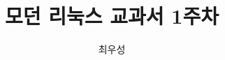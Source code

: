 \documentclass[11pt, a4paper, oneside, chapter, romanfixed]{oblivoir}
\begin{document}
\title{모던 리눅스 교과서 1주차}
\author{최우성}
\date{ }
\maketitle
\newpage


\tableofcontents



\end{document}
